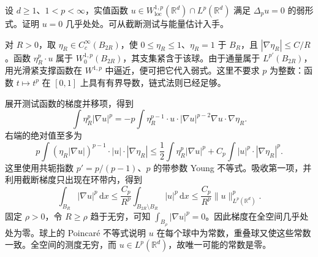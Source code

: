 \begin{exercise}\label{b2:ex:H2-liouville}
设 \(d\ge1\)、\(1<p<\infty\)，实值函数
\(u\in W^{1,p}_{\mathrm{loc}}(\mathbb R^d)\cap L^p(\mathbb R^d)\)
满足 \(\Delta_pu=0\) 的弱形式。证明 \(u=0\) 几乎处处。可从截断测试与能量估计入手。
\end{exercise}
\begin{solution}
对 \(R>0\)，取 \(\eta_R\in C_c^\infty(B_{2R})\)，使
\(0\le\eta_R\le1\)、\(\eta_R=1\) 于 \(B_R\)，且
\(|\nabla\eta_R|\le C/R\)。函数 \(\eta_R^p\cdot u\) 属于 \(W_0^{1,p}(B_{2R})\)，其支集紧含于该球。由于通量属于 \(L^{p'}(B_{2R})\)，用光滑紧支撑函数在 \(W^{1,p}\) 中逼近，便可把它代入弱式。这里不要求 \(p\) 为整数：函数 \(t\mapsto t^p\) 在 \([0,1]\) 上具有有界导数，链式法则已经足够。

展开测试函数的梯度并移项，得到
\[
 \int\eta_R^p|\nabla u|^p
 =-p\int\eta_R^{p-1}\cdot u\cdot
       |\nabla u|^{p-2}\nabla u\cdot\nabla\eta_R.
\]
右端的绝对值至多为
\[
 p\int(\eta_R|\nabla u|)^{p-1}\cdot|u|\cdot|\nabla\eta_R|
 \le\frac12\int\eta_R^p|\nabla u|^p
       +C_p\int|u|^p\cdot|\nabla\eta_R|^p.
\]
这里使用共轭指数 \(p'=p/(p-1)\)、\(p\) 的带参数 Young 不等式。吸收第一项，并利用截断梯度只出现在环带内，得到
\[
 \int_{B_R}|\nabla u|^p\,\mathrm dx
 \le\frac{C_p}{R^p}\int_{B_{2R}\setminus B_R}|u|^p\,\mathrm dx
 \le\frac{C_p}{R^p}\|u\|_{L^p(\mathbb R^d)}^p.
\]
固定 \(\rho>0\)，令 \(R\ge\rho\) 趋于无穷，可知 \(\int_{B_\rho}|\nabla u|^p=0\)。因此梯度在全空间几乎处处为零。球上的 Poincaré 不等式说明 \(u\) 在每个球中为常数，重叠球又使这些常数一致。全空间的测度无穷，而 \(u\in L^p(\mathbb R^d)\)，故唯一可能的常数是零。
\end{solution}

